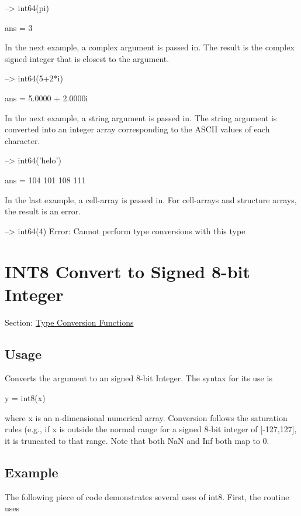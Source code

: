 \begin{DoxyVerbInclude}
--> int64(pi)

ans = 
 3 
\end{DoxyVerbInclude}


In the next example, a complex argument is passed in. The result is the complex signed integer that is closest to the argument.


\begin{DoxyVerbInclude}
--> int64(5+2*i)

ans = 
   5.0000 +  2.0000i 
\end{DoxyVerbInclude}


In the next example, a string argument is passed in. The string argument is converted into an integer array corresponding to the A\-S\-C\-I\-I values of each character.


\begin{DoxyVerbInclude}
--> int64('helo')

ans = 
 104 101 108 111 
\end{DoxyVerbInclude}


In the last example, a cell-\/array is passed in. For cell-\/arrays and structure arrays, the result is an error.


\begin{DoxyVerbInclude}
--> int64({4})
Error: Cannot perform type conversions with this type
\end{DoxyVerbInclude}
 \hypertarget{typecast_int8}{}\section{I\-N\-T8 Convert to Signed 8-\/bit Integer}\label{typecast_int8}
Section\-: \hyperlink{sec_typecast}{Type Conversion Functions} \hypertarget{vtkwidgets_vtkxyplotwidget_Usage}{}\subsection{Usage}\label{vtkwidgets_vtkxyplotwidget_Usage}
Converts the argument to an signed 8-\/bit Integer. The syntax for its use is \begin{DoxyVerb}   y = int8(x)
\end{DoxyVerb}
 where {\ttfamily x} is an {\ttfamily n}-\/dimensional numerical array. Conversion follows the saturation rules (e.\-g., if {\ttfamily x} is outside the normal range for a signed 8-\/bit integer of {\ttfamily \mbox{[}-\/127,127\mbox{]}}, it is truncated to that range. Note that both {\ttfamily Na\-N} and {\ttfamily Inf} both map to 0. \hypertarget{variables_struct_Example}{}\subsection{Example}\label{variables_struct_Example}
The following piece of code demonstrates several uses of {\ttfamily int8}. First, the routine uses


